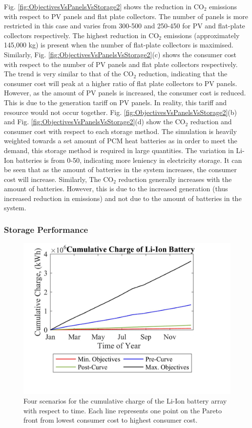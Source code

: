 Fig. \ref{fig:ObjectivesVsPanelsVsStorage2} shows the reduction in CO$_2$ emissions with respect to PV panels and flat plate collectors. The number of panels is more restricted in this case and varies from 300-500 and 250-450 for PV and flat-plate collectors respectively. The highest reduction in CO$_2$ emissions (approximately 145,000 kg) is present when the number of flat-plate collectors is maximised. Similarly, Fig. \ref{fig:ObjectivesVsPanelsVsStorage2}(c) shows the consumer cost with respect to the number of PV panels and flat plate collectors respectively. The trend is very similar to that of the CO$_2$ reduction, indicating that the consumer cost will peak at a higher ratio of flat plate collectors to PV panels. However, as the amount of PV panels is increased, the consumer cost is reduced. This is due to the generation tariff on PV panels. In reality, this tariff and resource would not occur together. Fig. \ref{fig:ObjectivesVsPanelsVsStorage2}(b) and Fig. \ref{fig:ObjectivesVsPanelsVsStorage2}(d) show the CO$_2$ reduction and consumer cost with respect to each storage method. The simulation is heavily weighted towards a set amount of PCM heat batteries as in order to meet the demand, this storage method is required in large quantities. The variation in Li-Ion batteries is from 0-50, indicating more leniency in electricity storage. It can be seen that as the amount of batteries in the system increases, the consumer cost will increase. Similarly, The CO$_2$ reduction generally increases with the amount of batteries. However, this is due to the increased generation (thus increased reduction in emissions) and not due to the amount of batteries in the system.
  
\subsubsection{Storage Performance}

\begin{figure}[H]
	\centering
    \includegraphics[width=1.12\columnwidth]{Figures/CumBat2.png}
    \caption{Four scenarios for the cumulative charge of the Li-Ion battery array with respect to time. Each line represents one point on the Pareto front from lowest consumer cost to highest consumer cost.}
    \label{fig:CumBat2}
\end{figure}
 
